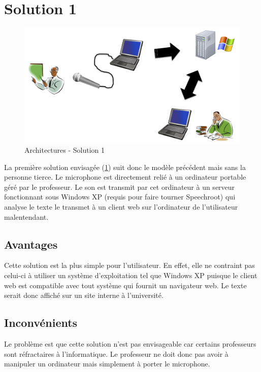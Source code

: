 \section{Solution 1}


\begin{figure}[h]
 \centering
 \includegraphics[scale=0.5]{./img/solution1.png}
 \caption{Architectures - Solution 1}
 \label{fig:solution1}
\end{figure}



La première solution envisagée (\ref{fig:solution1}) suit donc le modèle précédent mais sans la personne tierce.
Le microphone est directement relié à un ordinateur portable géré par le professeur.
Le son est transmit par cet ordinateur à un serveur fonctionnant sous Windows XP (requis pour faire tourner Speechroot) qui analyse le texte le transmet à un client web sur l'ordinateur de l'utilisateur malentendant.

\subsection{Avantages}
Cette solution est la plus simple pour l'utilisateur. En effet, elle ne contraint pas celui-ci à utiliser un système d'exploitation tel que Windows XP puisque le client web est compatible avec tout système qui fournit un navigateur web. Le texte serait donc affiché sur un site interne à l'université.

\subsection{Inconvénients}
Le problème est que cette solution n'est pas envisageable car certains professeurs sont ré\-frac\-tai\-res à l'informatique. Le professeur ne doit donc pas avoir à manipuler un ordinateur mais simplement à porter le microphone.



